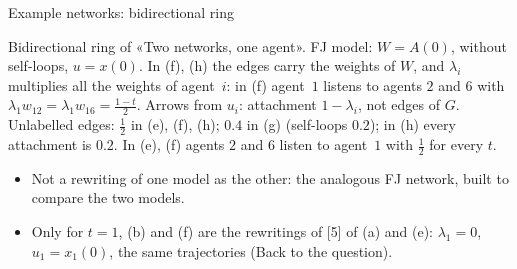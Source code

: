 \documentclass[10pt, aspectratio=169]{beamer}
\begin{document}
\begin{frame}[label=m-fj-graphs-ring]{Example networks: bidirectional ring}
  \smallskip
  {\scriptsize Bidirectional ring of «Two networks, one agent». FJ model: $W = A(0)$, without self-loops,
  $u = x(0)$. In (f), (h) the edges carry the weights of $W$, and $\lambda_i$ multiplies all
  the weights of agent~$i$: in (f) agent~$1$ listens to agents $2$ and $6$ with
  $\lambda_1 w_{12} = \lambda_1 w_{16} = \frac{1-t}{2}$. Arrows from $u_i$: attachment
  $1 - \lambda_i$, not edges of $G$. Unlabelled edges: $\frac12$ in (e), (f), (h); $0.4$ in (g)
  (self-loops $0.2$); in (h) every attachment is $0.2$. In (e), (f) agents $2$ and $6$
  listen to agent~$1$ with $\frac12$ for every $t$.\par}

  \smallskip
  \footnotesize
  \begin{itemize}
    \item Not a rewriting of one model as the other: the analogous FJ network, built to
          compare the two models.
    \item Only for $t = 1$, (b) and (f) are the rewritings of [5] of (a) and (e): $\lambda_1 = 0$,
          $u_1 = x_1(0)$, the same trajectories (Back to the question).
  \end{itemize}
\end{frame}
\end{document}
